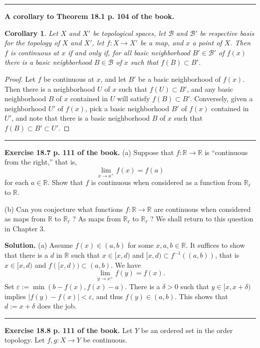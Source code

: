 \documentclass[12pt,letterpaper]{article}
\newtheorem{cor}[thm]{Corollary}
\newcommand{\B}{\mathcal B}
\newcommand{\hs}{\bigskip\hrule\medskip}
\newcommand{\noi}{\noindent}%
\newcommand{\R}{\mathbb R}
\begin{document}
\hs

\noi\textbf{A corollary to Theorem 18.1 p. 104 of the book.} 

\begin{cor}\label{C18.1a}
Let $X$ and $X'$ be topological spaces, let $\B$ and $\B'$ be respective basis for the topology of $X$ and $X'$, let $f:X\to X'$ be a map, and $x$ a point of $X$. Then $f$ is continuous at $x$ if and only if, for all basic neighborhood $B'\in\B'$ of $f(x)$ there is a basic neighborhood $B\in\B$ of $x$ such that $f(B)\subset B'$. 
\end{cor} 

\begin{proof}
Let $f$ be continuous at $x$, and let $B'$ be a basic neighborhood of $f(x)$. Then there is a neighborhood $U$ of $x$ such that $f(U)\subset B'$, and any basic neighborhood $B$ of $x$ contained in $U$ will satisfy $f(B)\subset B'$. Conversely, given a neighborhood $U'$ of $f(x)$, pick a basic neighborhood $B'$ of $f(x)$ contained in $U'$, and note that there is a basic neighborhood $B$ of $x$ such that $f(B)\subset B'\subset U'$.  
\end{proof}

\smallskip\hrule\medskip 

\noi\textbf{Exercise 18.7 p. 111 of the book.} (a) Suppose that $f: \mathbb{R} \rightarrow \mathbb{R}$ is ``continuous from the right,'' that is,
\[
\lim _{x \rightarrow a^{+}} f(x)=f(a)
\]
for each $a \in \mathbb{R}$. Show that $f$ is continuous when considered as a function from $\mathbb{R}_{\ell}$ to $\mathbb{R}$.

\noi(b) Can you conjecture what functions $f: \mathbb{R} \rightarrow \mathbb{R}$ are continuous when considered as maps from $\mathbb{R}$ to $\mathbb{R}_{\ell}$ ? As maps from $\mathbb{R}_{\ell}$ to $\mathbb{R}_{\ell}$ ? We shall return to this question in Chapter 3.

\noi\textbf{Solution.} (a) Assume $f(x)\in(a,b)$ for some $x,a,b\in\R$. It suffices to show that there is a $d$ in $\R$ such that $x\in[x,d)$ and $[x,d)\subset f^{-1}((a,b))$, that is $x\in[x,d)$ and $f([x,d))\subset(a,b)$. We have 
\[
\lim _{y\rightarrow x^{+}}f(y)=f(x).
\] 
Set $\varepsilon:=\min(b-f(x),f(x)-a)$. There is a $\delta>0$ such that $y\in[x,x+\delta)$ implies $|f(y)-f(x)|<\varepsilon$, and thus $f(y)\in(a,b)$. This shows that $d:=x+\delta$ does the job. 

\hs 

\noi\textbf{Exercise 18.8 p. 111 of the book.} Let $Y$ be an ordered set in the order topology. Let $f, g: X \rightarrow Y$ be continuous.
\end{document}

